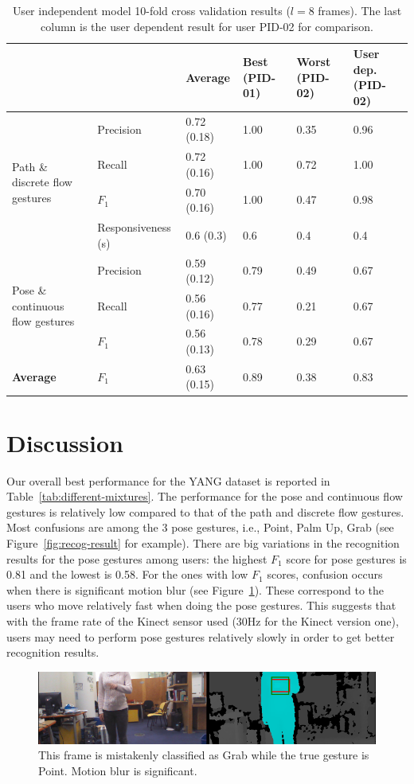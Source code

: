\begin{table}[tbh]
\centering
\begin{tabular}{|p{3cm}|l|l|p{1.9cm}|p{1.9cm}||p{2cm}|}
\hline
& & \textbf{Average} & \textbf{Best (PID-01)} & \textbf{Worst (PID-02)} &
\textbf{User dep. (PID-02)} \\
\hline
\multirow{4}{3cm}{Path \& discrete flow gestures} 
& Precision & 0.72 (0.18) & 1.00 & 0.35 & 0.96 \\
\cline{2-6}
& Recall    & 0.72 (0.16) & 1.00 & 0.72 & 1.00\\
\cline{2-6}
& $F_1$ & 0.70 (0.16) & 1.00 & 0.47 & 0.98 \\
\cline{2-6}
& Responsiveness (s) & 0.6 (0.3)  & 0.6 & 0.4 &  0.4\\
\hline
\multirow{3}{3cm}{Pose \& continuous flow gestures}
& Precision & 0.59 (0.12) & 0.79 & 0.49 & 0.67\\
\cline{2-6}
& Recall & 0.56 (0.16) & 0.77 & 0.21 & 0.67\\
\cline{2-6}
& $F_1$ & 0.56 (0.13)  & 0.78 & 0.29 & 0.67\\
\hline
\textbf{Average} & $F_1$ & 0.63 (0.15) & 0.89 & 0.38 & 0.83\\
\hline
\end{tabular}
\caption{User independent model 10-fold cross validation results ($l = 8$
frames). The last column is the user dependent result for user PID-02 for
comparison.}
\label{tab:user-independent}
\end{table}

\section{Discussion}
Our overall best performance for the YANG dataset is reported in
Table~\ref{tab:different-mixtures}. The performance for the pose and
continuous flow gestures is relatively low compared to that of the path and
discrete flow gestures. Most
confusions are among the 3 pose gestures, i.e., Point, Palm Up, Grab (see
Figure~\ref{fig:recog-result} for example).
There are big variations in the recognition results for the pose gestures among users: the highest $F_1$ score for pose gestures is 0.81
and the lowest is 0.58. For the ones with low $F_1$ scores, confusion occurs
when there is significant motion blur (see Figure~\ref{fig:point_grab}). These
correspond to the users who move relatively fast when doing the pose gestures.
This suggests that with the frame rate of the Kinect sensor used (30Hz for
the Kinect version one), users may need to perform pose gestures relatively
slowly in order to get better recognition results.

\begin{figure}[tbh]
\centering
\includegraphics[width=\linewidth]{figures/point_posture_full_image.png}
\caption{This frame is mistakenly classified as Grab while the true gesture
is Point. Motion blur is significant.}
\label{fig:point_grab}
\end{figure}